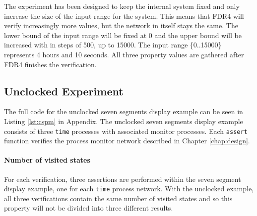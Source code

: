 The experiment has been designed to keep the internal system fixed and only increase the size of the input range for the system. This means that FDR4 will verify increasingly more values, but the network in itself stays the same.
The lower bound of the input range will be fixed at 0 and the upper bound will be increased with in steps of 500, up to 15000. The input range \{0..15000\} represents 4 hours and 10 seconds. All three property values are gathered after FDR4 finishes the verification.
\subsection{Unclocked Experiment}
The full code for the unclocked seven segments display example can be seen in Listing \ref{lst:cspm} in Appendix. %
The unclocked seven segments display example consists of three \texttt{time} processes with associated monitor processes. Each \texttt{assert} function verifies the process monitor network described in Chapter \ref{chap:design}.
\paragraph{Number of visited states}
For each verification, three assertions are performed within the seven segment display example, one for each \texttt{time} process network. With the unclocked example, all three verifications contain the same number of visited states and so this property will not be divided into three different results.\\

